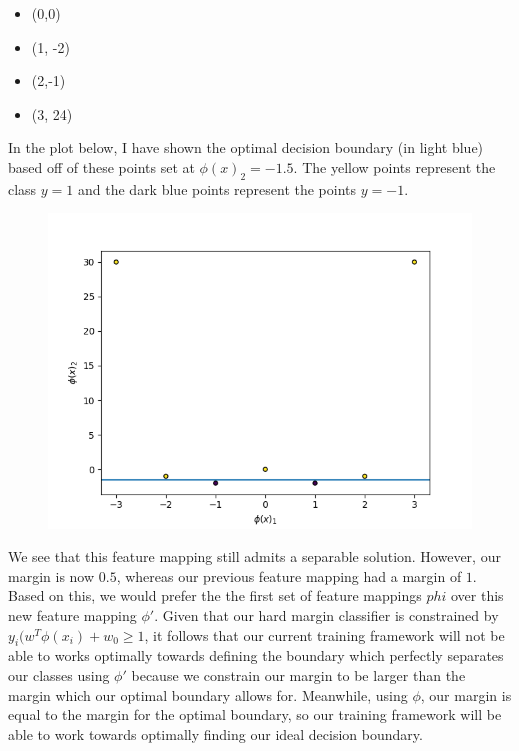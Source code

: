 \documentclass[submit]{harvardml}
\begin{document}
\begin{enumerate}
\begin{itemize}
        \item (0,0) 
        \item(1, -2) 
        \item (2,-1) 
         \item (3, 24)
    \end{itemize}
    In the plot below, I have shown the optimal decision boundary (in light blue) based off of these points set at $\phi(x)_2 = -1.5$. The yellow points represent the class $y = 1$ and the dark blue points represent the points $y = -1$. \\
    \begin{figure}[h!]
        \centering
        \includegraphics[height=0.4\textheight]{HW4/P1part8plot.png}
    \end{figure}
    We see that this feature mapping still admits a separable solution. However, our margin is now $0.5$, whereas our previous feature mapping had a margin of $1$. Based on this, we would prefer the the first set of feature mappings $phi$ over this new feature mapping $\phi'$. Given that our hard margin classifier is constrained by $y_i (w^T \phi(x_i) + w_0 \geq 1$, it follows that our current training framework will not be able to works optimally towards defining the boundary which perfectly separates our classes using $\phi'$ because we constrain our margin to be larger than the margin which our optimal boundary allows for. Meanwhile, using $\phi$, our margin is equal to the margin for the optimal boundary, so our training framework will be able to work towards optimally finding our ideal decision boundary.

    
\end{enumerate}
\end{document}
